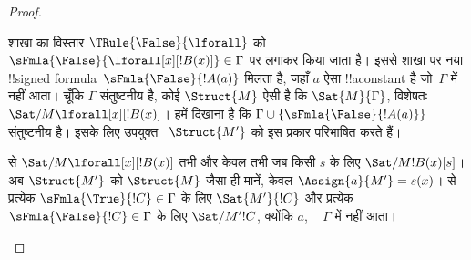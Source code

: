 \documentclass[../../../include/open-logic-section]{subfiles}
\begin{document}
\begin{proof}
\begin{enumerate}
{\item शाखा का विस्तार $\TRule{\False}{\lforall}$ को
  $\sFmla{\False}{\lforall[x][!B(x)]} \in \Gamma$ पर लगाकर किया जाता है। इससे शाखा पर
  नया !!{signed formula}~$\sFmla{\False}{!A(a)}$ मिलता है, जहाँ $a$ ऐसा
  !!a{constant} है जो~$\Gamma$ में नहीं आता। चूँकि $\Gamma$ संतुष्टनीय है,
  कोई $\Struct{M}$ ऐसी है कि $\Sat{M}{\Gamma}$, विशेषतः
  $\Sat/{M}{\lforall[x][!B(x)]}$। हमें दिखाना है कि
  $\Gamma \cup \{\sFmla{\False}{!A(a)}\}$ संतुष्टनीय है। इसके लिए उपयुक्त
  ~$\Struct{M'}$ को इस प्रकार परिभाषित करते हैं।

   से
  $\Sat/{M}{\lforall[x][!B(x)]}$ तभी और केवल तभी जब किसी $s$ के लिए
  $\Sat/{M}{!B(x)}[s]$। अब $\Struct{M'}$ को $\Struct{M}$ जैसा ही मानें,
  केवल $\Assign{a}{M'} = s(x)$।
   से प्रत्येक
  $\sFmla{\True}{!C} \in \Gamma$ के लिए $\Sat{M'}{!C}$ और प्रत्येक
  $\sFmla{\False}{!C} \in \Gamma$ के लिए $\Sat/{M'}{!C}$, क्योंकि $a$,
  ~ $\Gamma$ में नहीं आता।

}
\end{enumerate}
\end{proof}
\end{document}
